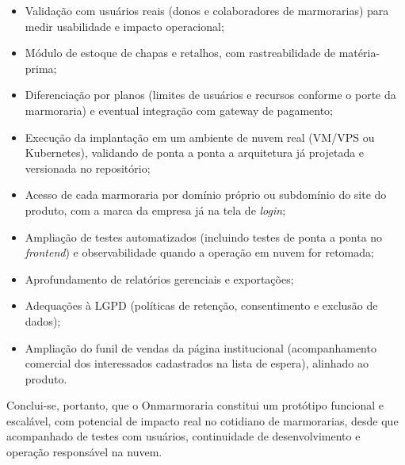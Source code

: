 \begin{itemize}
  \item Validação com usuários reais (donos e colaboradores de marmorarias) para medir usabilidade e impacto operacional;
  \item Módulo de estoque de chapas e retalhos, com rastreabilidade de matéria-prima;
  \item Diferenciação por planos (limites de usuários e recursos conforme o porte da marmoraria) e eventual integração com gateway de pagamento;
  \item Execução da implantação em um ambiente de nuvem real (VM/VPS ou Kubernetes), validando de ponta a ponta a arquitetura já projetada e versionada no repositório;
  \item Acesso de cada marmoraria por domínio próprio ou subdomínio do site do produto, com a marca da empresa já na tela de \textit{login};
  \item Ampliação de testes automatizados (incluindo testes de ponta a ponta no \textit{frontend}) e observabilidade quando a operação em nuvem for retomada;
  \item Aprofundamento de relatórios gerenciais e exportações;
  \item Adequações à LGPD (políticas de retenção, consentimento e exclusão de dados);
  \item Ampliação do funil de vendas da página institucional (acompanhamento comercial dos interessados cadastrados na lista de espera), alinhado ao produto.
\end{itemize}

Conclui-se, portanto, que o Onmarmoraria constitui um protótipo funcional e escalável, com potencial de impacto real no cotidiano de marmorarias, desde que acompanhado de testes com usuários, continuidade de desenvolvimento e operação responsável na nuvem.

